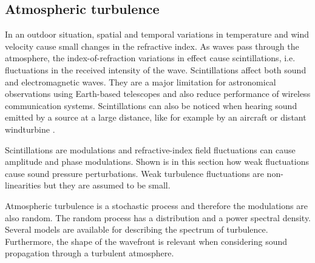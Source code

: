 



\subsection{Atmospheric turbulence}

In an outdoor situation, spatial and temporal variations in temperature and wind
velocity cause small changes in the refractive index. As waves pass through the
atmosphere, the index-of-refraction variations in effect cause scintillations,
i.e. fluctuations in the received intensity of the wave. Scintillations affect
both sound and electromagnetic waves. They are a major limitation for
astronomical observations using Earth-based telescopes and also reduce
performance of wireless communication systems. Scintillations can also be
noticed when hearing sound emitted by a source at a large distance, like for
example by an aircraft or distant windturbine \cite{Heutschi2014}.

Scintillations are modulations and refractive-index field fluctuations can cause
amplitude and phase modulations. Shown is in this section how weak fluctuations
cause sound pressure perturbations. Weak turbulence fluctuations are
non-linearities but they are assumed to be small.

Atmospheric turbulence is a stochastic process and therefore the modulations are
also random. The random process has a distribution and a power spectral density.
Several models are available for describing the spectrum of turbulence.
Furthermore, the shape of the wavefront is relevant when considering sound
propagation through a turbulent atmosphere.

